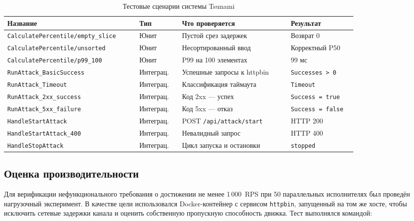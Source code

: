 \begin{table}[h!]
  \centering
  \caption{Тестовые сценарии системы Tsunami}
  \label{tab:ch2-tests}
  \small
  \begin{tabular}{|p{0.34\linewidth}|p{0.11\linewidth}|p{0.29\linewidth}|p{0.17\linewidth}|}
    \hline
    \textbf{Название} & \textbf{Тип} & \textbf{Что проверяется} & \textbf{Результат} \\
    \hline
    \texttt{CalculatePercentile/empty\_slice} & Юнит & Пустой срез задержек & Возврат 0 \\
    \hline
    \texttt{CalculatePercentile/unsorted} & Юнит & Несортированный ввод & Корректный P50 \\
    \hline
    \texttt{CalculatePercentile/p99\_100} & Юнит & P99 на 100 элементах & 99 мс \\
    \hline
    \texttt{RunAttack\_BasicSuccess} & Интеграц. & Успешные запросы к httpbin & \texttt{Successes > 0} \\
    \hline
    \texttt{RunAttack\_Timeout} & Интеграц. & Классификация таймаута & \texttt{Timeout} \\
    \hline
    \texttt{RunAttack\_2xx\_success} & Интеграц. & Код 2xx --- успех & \texttt{Success = true} \\
    \hline
    \texttt{RunAttack\_5xx\_failure} & Интеграц. & Код 5xx --- отказ & \texttt{Success = false} \\
    \hline
    \texttt{HandleStartAttack} & Интеграц. & POST \texttt{/api/attack/start} & HTTP 200 \\
    \hline
    \texttt{HandleStartAttack\_400} & Интеграц. & Невалидный запрос & HTTP 400 \\
    \hline
    \texttt{HandleStopAttack} & Интеграц. & Цикл запуска и остановки & \texttt{stopped} \\
    \hline
  \end{tabular}
\end{table}

\subsection*{Оценка производительности}

Для верификации нефункционального требования о достижении не менее 1\,000~RPS
при 50 параллельных исполнителях был проведён нагрузочный эксперимент.
В качестве цели использовался Docker-контейнер с сервисом \texttt{httpbin},
запущенный на том же хосте, чтобы исключить сетевые задержки канала
и оценить собственную пропускную способность движка.
Тест выполнялся командой:


